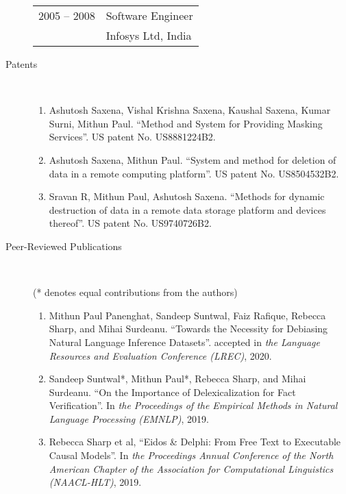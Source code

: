 \documentclass[10pt]{article}
\newcommand{\ve}[1]{{\em #1}} %
\newcommand{\ti}[1]{``#1''} %
\begin{document}
\begin{description}
\begin{tabular}{lp{4.9in}}
\hspace{-.2cm}2005 -- 2008 & Software Engineer	\\
& {\sc Infosys Ltd, India} 
\end{tabular}

\item [Patents] \
\begin{enumerate}


\item 
Ashutosh Saxena, Vishal Krishna Saxena, Kaushal Saxena, Kumar Surni, Mithun Paul. \ti{Method and System for Providing Masking Services}.  US patent No. US8881224B2.
\item 
Ashutosh Saxena, Mithun Paul. \ti{System and method for deletion of data in a remote computing platform}.  US patent No. US8504532B2.
\item 
Sravan R, Mithun Paul, Ashutosh Saxena. \ti{Methods for dynamic destruction of data in a remote data storage platform and devices thereof}.  US patent No. US9740726B2.

\end{enumerate}
\bigskip
\item [ Peer-Reviewed  Publications]\


(* denotes equal contributions from the authors)

\begin{enumerate}

\item Mithun Paul Panenghat, Sandeep Suntwal, Faiz Rafique, Rebecca Sharp, and Mihai Surdeanu.   \ti{Towards the Necessity for Debiasing Natural Language Inference Datasets}. accepted in \ve{the Language Resources and Evaluation Conference (LREC)}, 2020.

\item Sandeep Suntwal*, Mithun Paul*, Rebecca Sharp, and Mihai Surdeanu.   \ti{On the Importance of Delexicalization for Fact Verification}. In \ve{the Proceedings of the Empirical Methods in Natural Language Processing (EMNLP)}, 2019.

\item  Rebecca Sharp et al,   \ti{Eidos \& Delphi: From Free Text to Executable Causal Models}. In \ve{ the Proceedings Annual Conference of the North American Chapter of the Association for Computational Linguistics (NAACL-HLT)}, 2019.

\end{enumerate}


\begin{enumerate}
\setcounter{enumi}{2}



\end{enumerate}
\end{description}
\end{document}
